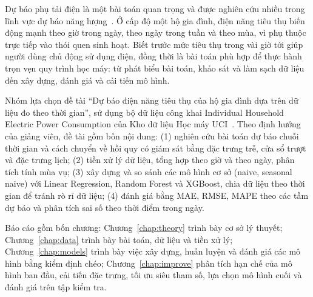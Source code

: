 \label{chap:introduction}

Dự báo phụ tải điện là một bài toán quan trọng và được nghiên cứu nhiều trong lĩnh vực dự báo năng lượng~\cite{hong2016probabilistic,hong2020energy}. Ở cấp độ một hộ gia đình, điện năng tiêu thụ biến động mạnh theo giờ trong ngày, theo ngày trong tuần và theo mùa, vì phụ thuộc trực tiếp vào thói quen sinh hoạt. Biết trước mức tiêu thụ trong vài giờ tới giúp người dùng chủ động sử dụng điện, đồng thời là bài toán phù hợp để thực hành trọn vẹn quy trình học máy: từ phát biểu bài toán, khảo sát và làm sạch dữ liệu đến xây dựng, đánh giá và cải tiến mô hình.

Nhóm lựa chọn đề tài ``Dự báo điện năng tiêu thụ của hộ gia đình dựa trên dữ liệu đo theo thời gian'', sử dụng bộ dữ liệu công khai Individual Household Electric Power Consumption của Kho dữ liệu Học máy UCI~\cite{hebrail2006uci}. Theo định hướng của giảng viên, đề tài gồm bốn nội dung: (1) nghiên cứu bài toán dự báo chuỗi thời gian và cách chuyển về hồi quy có giám sát bằng đặc trưng trễ, cửa sổ trượt và đặc trưng lịch; (2) tiền xử lý dữ liệu, tổng hợp theo giờ và theo ngày, phân tích tính mùa vụ; (3) xây dựng và so sánh các mô hình cơ sở (naive, seasonal naive) với Linear Regression, Random Forest và XGBoost, chia dữ liệu theo thời gian để tránh rò rỉ dữ liệu; (4) đánh giá bằng MAE, RMSE, MAPE theo các tầm dự báo và phân tích sai số theo thời điểm trong ngày.

Báo cáo gồm bốn chương: Chương~\ref{chap:theory} trình bày cơ sở lý thuyết; Chương~\ref{chap:data} trình bày bài toán, dữ liệu và tiền xử lý; Chương~\ref{chap:models} trình bày việc xây dựng, huấn luyện và đánh giá các mô hình bằng kiểm định chéo; Chương~\ref{chap:improve} phân tích hạn chế của mô hình ban đầu, cải tiến đặc trưng, tối ưu siêu tham số, lựa chọn mô hình cuối và đánh giá trên tập kiểm tra.
